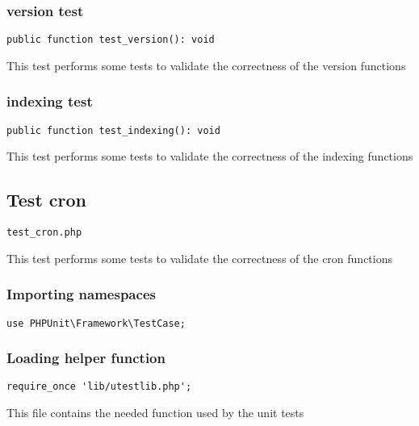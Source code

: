 \documentclass[a4paper]{article}
\begin{document}
\hypertarget{toc104}{}
\subsubsection{version test}

\begin{lstlisting}
public function test_version(): void
\end{lstlisting}

This test performs some tests to validate the correctness
of the version functions

\hypertarget{toc105}{}
\subsubsection{indexing test}

\begin{lstlisting}
public function test_indexing(): void
\end{lstlisting}

This test performs some tests to validate the correctness
of the indexing functions

\hypertarget{toc106}{}
\subsection{Test cron}

\begin{lstlisting}
test_cron.php
\end{lstlisting}

This test performs some tests to validate the correctness
of the cron functions

\hypertarget{toc107}{}
\subsubsection{Importing namespaces}

\begin{lstlisting}
use PHPUnit\Framework\TestCase;
\end{lstlisting}

\hypertarget{toc108}{}
\subsubsection{Loading helper function}

\begin{lstlisting}
require_once 'lib/utestlib.php';
\end{lstlisting}

This file contains the needed function used by the unit tests
\end{document}
